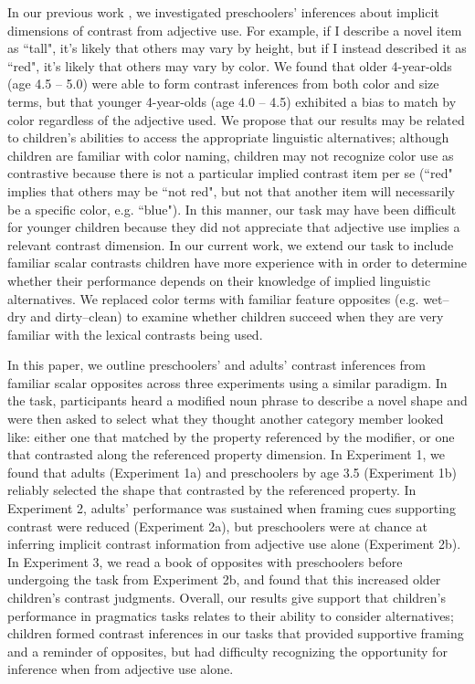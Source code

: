 \documentclass[10pt,letterpaper]{article}
\begin{document}
In our previous work \cite{horowitz2012}, we investigated preschoolers' inferences about implicit dimensions of contrast from adjective use.  For example, if I describe a novel item as ``tall", it's likely that others may vary by height, but if I instead described it as ``red", it's likely that others may vary by color.  We found that older 4-year-olds (age 4.5 -- 5.0) were able to form contrast inferences from both color and size terms, but that younger 4-year-olds (age 4.0 -- 4.5) exhibited a bias to match by color regardless of the adjective used.  We propose that our results may be related to children's abilities to access the appropriate linguistic alternatives; although children are familiar with color naming, children may not recognize color use as contrastive because there is not a particular implied contrast item per se (``red" implies that others may be ``not red", but not that another item will necessarily be a specific color, e.g. ``blue").  In this manner, our task may have been difficult for younger children because they did not appreciate that adjective use implies a relevant contrast dimension.  In our current work, we extend our task to include familiar scalar contrasts children have more experience with in order to determine whether their performance depends on their knowledge of implied linguistic alternatives.  We replaced color terms with familiar feature opposites (e.g. wet--dry and dirty--clean) to examine whether children succeed when they are very familiar with the lexical contrasts being used.

In this paper, we outline preschoolers' and adults' contrast inferences from familiar scalar opposites across three experiments using a similar paradigm.  In the task, participants heard a modified noun phrase to describe a novel shape and were then asked to select what they thought another category member looked like: either one that matched by the property referenced by the modifier, or one that contrasted along the referenced property dimension.  In Experiment 1, we found that adults (Experiment 1a) and preschoolers by age 3.5 (Experiment 1b) reliably selected the shape that contrasted by the referenced property.  In Experiment 2, adults' performance was sustained when framing cues supporting contrast were reduced (Experiment 2a), but preschoolers were at chance at inferring implicit contrast information from adjective use alone (Experiment 2b).  In Experiment 3, we read a book of opposites with preschoolers before undergoing the task from Experiment 2b, and found that this increased older children's contrast judgments.  Overall, our results give support that children's performance in pragmatics tasks relates to their ability to consider alternatives; children formed contrast inferences in our tasks that provided supportive framing and a reminder of opposites, but had difficulty recognizing the opportunity for inference when from adjective use alone. 
\end{document}
